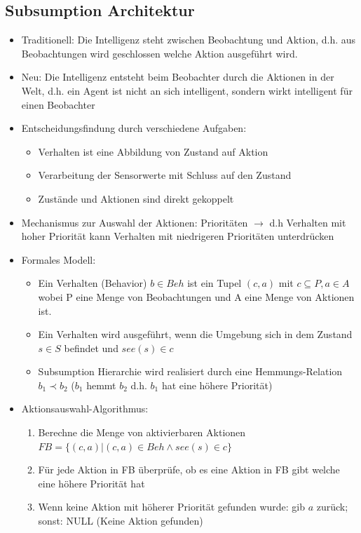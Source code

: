 \documentclass{article} %
\begin{document}
	\subsection{Subsumption Architektur}
	\begin{itemize}
		\item Traditionell: Die Intelligenz steht zwischen Beobachtung und Aktion, d.h. aus Beobachtungen wird geschlossen welche Aktion ausgeführt wird.
		\item Neu: Die Intelligenz entsteht beim Beobachter durch die Aktionen in der Welt, d.h. ein Agent ist nicht an sich intelligent, sondern wirkt intelligent für einen Beobachter
		\item Entscheidungsfindung durch verschiedene Aufgaben:
		\begin{itemize}
			\item Verhalten ist eine Abbildung von Zustand auf Aktion
			\item Verarbeitung der Sensorwerte mit Schluss auf den Zustand
			\item Zustände und Aktionen sind direkt gekoppelt
		\end{itemize}
		\item Mechanismus zur Auswahl der Aktionen: Prioritäten  $\rightarrow$ d.h Verhalten mit hoher Priorität kann Verhalten mit niedrigeren Prioritäten unterdrücken
		\item Formales Modell:
		\begin{itemize}
			\item Ein Verhalten (Behavior) $b \in Beh$ ist ein Tupel $(c,a)$ mit $c \subseteq P, a \in A$ wobei P eine Menge von Beobachtungen und A eine Menge von Aktionen ist.
			\item Ein Verhalten wird ausgeführt, wenn die Umgebung sich in dem Zustand $s\in S$ befindet und $see(s) \in c$
			\item Subsumption Hierarchie wird realisiert durch eine Hemmungs-Relation $b_{1} \prec b_{2}$ ($b_{1}$ hemmt $b_{2}$ d.h. $b_{1}$ hat eine höhere Priorität)
		\end{itemize}
		\item Aktionsauswahl-Algorithmus:
		\begin{enumerate}
			\item Berechne die Menge von aktivierbaren Aktionen $FB = \{(c,a)|(c,a)\in Beh \wedge see(s)\in c\}$
			\item Für jede Aktion in FB überprüfe, ob es eine Aktion in FB gibt welche eine höhere Priorität hat
			\item Wenn keine Aktion mit höherer Priorität gefunden wurde: gib $a$ zurück; sonst: NULL (Keine Aktion gefunden)

\end{enumerate}
\end{itemize}
\end{document}
